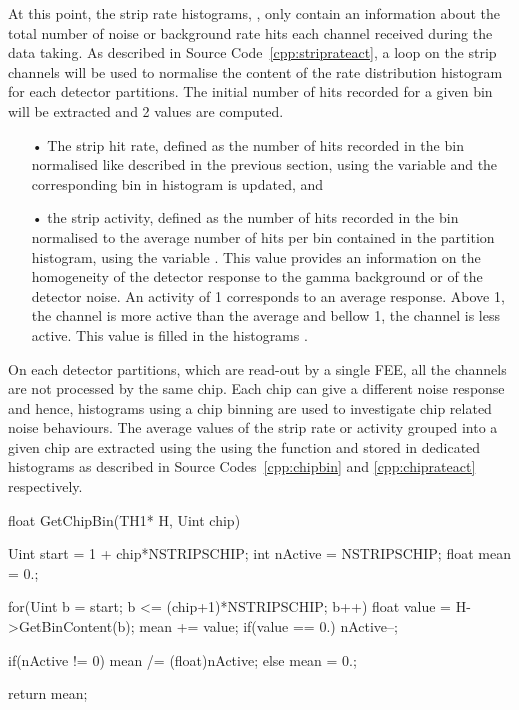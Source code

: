 	At this point, the strip rate histograms, , only contain an information about the total number of noise or background rate hits each channel received during the data taking. As described in Source Code~\ref{cpp:striprateact}, a loop on the strip channels will be used to normalise the content of the rate distribution histogram for each detector partitions. The initial number of hits recorded for a given bin will be extracted and 2 values are computed.

	\begin{itemize}
		\item[•] The strip hit rate, defined as the number of hits recorded in the bin normalised like described in the previous section, using the variable  and the corresponding bin in histogram  is updated, and
		\item[•] the strip activity, defined as the number of hits recorded in the bin normalised to the average number of hits per bin contained in the partition histogram, using the variable . This value provides an information on the homogeneity of the detector response to the gamma background or of the detector noise. An activity of 1 corresponds to an average response. Above 1, the channel is more active than the average and bellow 1, the channel is less active. This value is filled in the histograms .
	\end{itemize}
	
	On each detector partitions, which are read-out by a single FEE, all the channels are not processed by the same chip. Each chip can give a different noise response and hence, histograms using a chip binning are used to investigate chip related noise behaviours. The average values of the strip rate or activity grouped into a given chip are extracted using the using the function  and stored in dedicated histograms as described in Source Codes~\ref{cpp:chipbin} and \ref{cpp:chiprateact} respectively.\\
	
	\begin{code}
	\begin{cppcode}
float GetChipBin(TH1* H, Uint chip){
    Uint start = 1 + chip*NSTRIPSCHIP;
    int nActive = NSTRIPSCHIP;
    float mean = 0.;

    for(Uint b = start; b <= (chip+1)*NSTRIPSCHIP; b++){
        float value = H->GetBinContent(b);
        mean += value;
        if(value == 0.) nActive--;
    }

    if(nActive != 0) mean /= (float)nActive;
    else mean = 0.;

    return mean;
}
	\end{cppcode}
	\label{cpp:chipbin}
	\vspace{5mm}
	\end{code}
	
